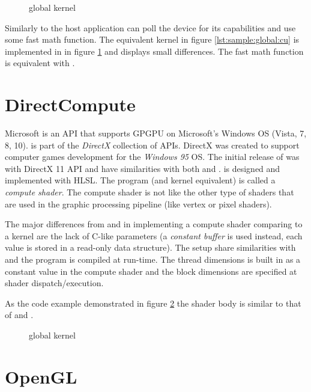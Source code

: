 \begin{figure}
	\centering
	\fbox{}
	\caption{{\OCL} global kernel}
	\label{lst:sample:global:ocl}	
\end{figure}

Similarly to {\CU} the host application can poll the device for its capabilities and use some fast math function. The equivalent {\CU} kernel in figure \ref{lst:sample:global:cu} is implemented in {\OCL} in figure \ref{lst:sample:global:ocl} and displays small differences. The {\CU} fast math function  is equivalent with .

\section{DirectCompute}

Microsoft {\DX} is an \gls{API} that supports \gls{GPGPU} on Microsoft's Windows \gls{OS} (Vista, 7, 8, 10). {\DX} is part of the \emph{DirectX} collection of APIs. DirectX was created to support computer games development for the \emph{Windows 95} OS. The initial release of {\DX} was with DirectX 11 \gls{API} and have similarities with both {\CU} and {\OCL}. {\DX} is designed and implemented with \gls{HLSL}. The program (and kernel equivalent) is called a \emph{compute shader}. The compute shader is not like the other type of shaders that are used in the graphic processing pipeline (like vertex or pixel shaders).

The major differences from {\CU} and {\OCL} in implementing a compute shader comparing to a kernel are the lack of C-like parameters (a \emph{constant buffer} is used instead, each value is stored in a read-only data structure). The setup share similarities with {\OCL} and the program is compiled at run-time. The thread dimensions is built in as a constant value in the compute shader and the block dimensions are specified at shader dispatch/execution.

As the code example demonstrated in figure \ref{lst:sample:global:dx} the shader body is similar to that of {\CU} and {\OCL}.

\begin{figure}
	\centering
	\fbox{}
	\caption{{\DX} global kernel}
	\label{lst:sample:global:dx}	
\end{figure}

\section{OpenGL}

